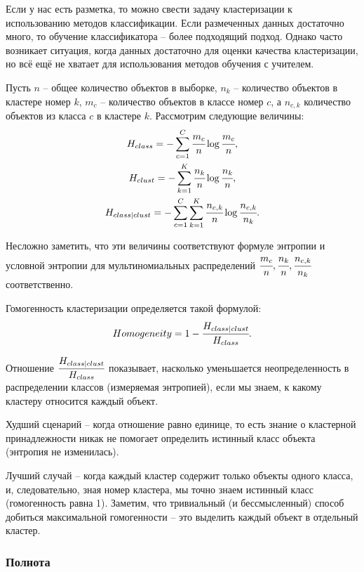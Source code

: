 Если у нас есть разметка, то можно свести задачу кластеризации к использованию методов классификации. Если размеченных данных достаточно много, то обучение классификатора -- более подходящий подход. Однако часто возникает ситуация, когда данных достаточно для оценки качества кластеризации, но всё ещё не хватает для использования методов обучения с учителем.

Пусть $n$ -- общее количество объектов в выборке, $n_k$ -- количество объектов в кластере номер $k$, $m_c$ -- количество объектов в классе номер $c$, а $n_{c,k}$ количество объектов из класса $c$ в кластере $k$. Рассмотрим следующие величины:
\begin{gather*}
    H_{class} = -\displaystyle\sum_{c=1}^C \cfrac{m_c}{n} \log\cfrac{m_c}{n}, \\
    H_{clust} = -\displaystyle\sum_{k=1}^K \cfrac{n_k}{n} \log\cfrac{n_k}{n}, \\
    H_{class \vert clust} = -\displaystyle\sum_{c=1}^C \sum_{k=1}^K \cfrac{n_{c,k}}{n} \log\cfrac{n_{c,k}}{n_k}.
\end{gather*}

Несложно заметить, что эти величины соответствуют формуле энтропии и условной энтропии для мультиномиальных распределений $\cfrac{m_c}{n}, \cfrac{n_k}{n}, \cfrac{n_{c,k}}{n_k}$ соответственно.

Гомогенность кластеризации определяется такой формулой:
\begin{equation*}
    Homogeneity = 1 - \cfrac{H_{class \vert clust}}{H_{class}}.
\end{equation*}

Отношение $\cfrac{H_{class \vert clust}}{H_{class}}$ показывает, насколько уменьшается неопределенность в распределении классов (измеряемая энтропией), если мы знаем, к какому кластеру относится каждый объект. 

Худший сценарий -- когда отношение равно единице, то есть знание о кластерной принадлежности никак не помогает определить истинный класс объекта (энтропия не изменилась). 

Лучший случай -- когда каждый кластер содержит только объекты одного класса, и, следовательно, зная номер кластера, мы точно знаем истинный класс (гомогенность равна 1). Заметим, что тривиальный (и бессмысленный) способ добиться максимальной гомогенности -- это выделить каждый объект в отдельный кластер.

\subsubsection{Полнота} \hfill\\

